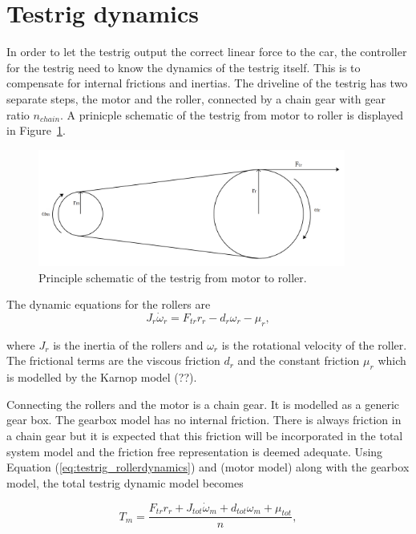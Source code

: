 \section{Testrig dynamics}
In order to let the testrig output the correct linear force to the car, the
controller for the testrig need to know the dynamics of the testrig itself. This
is to compensate for internal frictions and inertias. The driveline of the
testrig has two separate steps, the motor and the roller, connected by a chain
gear with gear ratio $n_{chain}$. A prinicple schematic of the testrig from
motor to roller is displayed in Figure~\ref{fig:testrig_testrigdynamics}.
\begin{figure}[H]
    \label{fig:testrig_testrigdynamics}
    \centering
    \includegraphics[width=0.9\textwidth]{./img/testrig_rollerschematic.png}
    \caption{Principle schematic of the testrig from motor to roller.}
\end{figure}
The dynamic equations for the rollers are
\begin{equation} \label{eq:testrig_rollerdynamics}
    J_r \dot{\omega}_r = F_{tr}r_r - d_r \omega_r - \mu_r,
\end{equation}

where $J_r$ is the inertia of the rollers and $\omega_r$ is the rotational velocity
of the roller. The frictional terms are the viscous friction $d_r$ and the
constant friction $\mu_r$ which is modelled by the Karnop model (??).

Connecting the rollers and the motor is a chain gear. It is modelled as a
generic gear box. The gearbox model has no internal friction. There is always friction in a
chain gear but it is expected that this friction will be incorporated in the
total system model and the friction free representation is deemed adequate.
Using Equation (\ref{eq:testrig_rollerdynamics}) and (motor model) along with
the gearbox model, the total testrig dynamic model becomes

\begin{equation} \label{eq:testrig_totaldynamics} 
    T_m = \frac{F_{tr} r_r + J_{tot} \dot{\omega}_m + d_{tot} \omega_m + \mu_{tot}}{n},
\end{equation}

